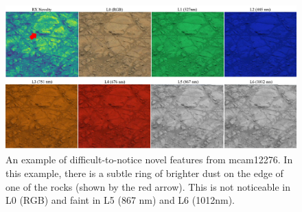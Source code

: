 \begin{figure}
\centering
\includegraphics[width=\linewidth]{figs/msl/mcam_novel.png}
\caption[An Example of a Difficult-to-Spot Region in a Mastcam Multispectral Image, Clearly Visible in RX]{An example of difficult-to-notice novel features from mcam12276. In this example, there is a subtle ring of brighter dust on the edge of one of the rocks (shown by the red arrow). This is not noticeable in L0 (RGB) and faint in L5 (867 nm) and L6 (1012nm).}
\label{msl/fig:mcam12276}
\end{figure}

